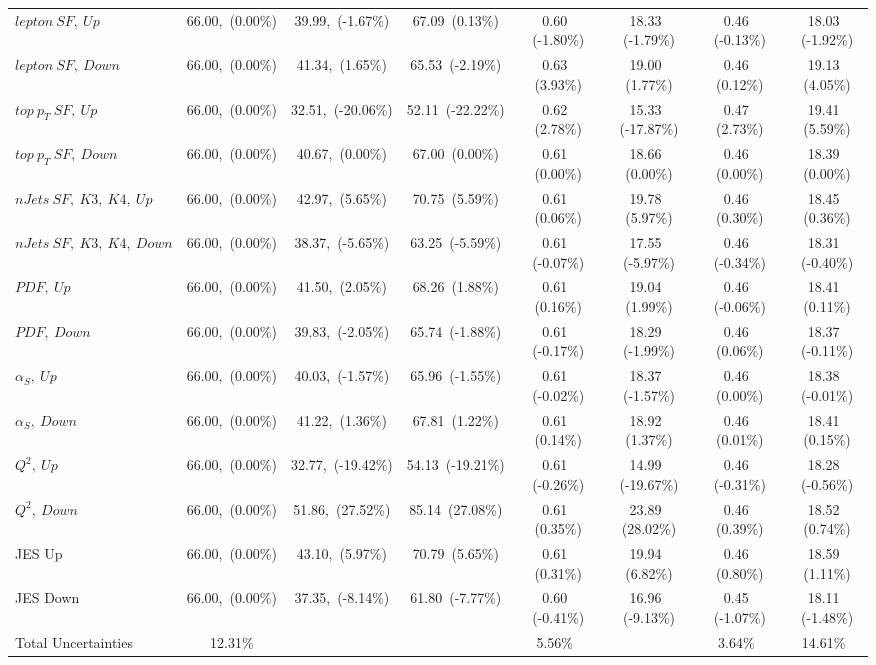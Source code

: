 \begin{table}
\begin{center}
{\begin{tabular}{|l|c|c|c|c|c|c|c|}
$lepton~SF,~Up$ & 66.00,~(0.00\%) & 39.99,~(-1.67\%) & 67.09~(0.13\%) & 0.60 ~(-1.80\%) & 18.33 ~(-1.79\%) & 0.46 ~(-0.13\%) & 18.03 ~(-1.92\%) \\  
$lepton~SF,~Down$ & 66.00,~(0.00\%) & 41.34,~(1.65\%) & 65.53~(-2.19\%) & 0.63 ~(3.93\%) & 19.00 ~(1.77\%) & 0.46 ~(0.12\%) & 19.13 ~(4.05\%) \\ \hline 
$top~p_{T}~SF,~Up$ & 66.00,~(0.00\%) & 32.51,~(-20.06\%) & 52.11~(-22.22\%) & 0.62 ~(2.78\%) & 15.33 ~(-17.87\%) & 0.47 ~(2.73\%) & 19.41 ~(5.59\%) \\  
$top~p_{T}~SF,~Down$ & 66.00,~(0.00\%) & 40.67,~(0.00\%) & 67.00~(0.00\%) & 0.61 ~(0.00\%) & 18.66 ~(0.00\%) & 0.46 ~(0.00\%) & 18.39 ~(0.00\%) \\ \hline 
$nJets~SF,~K3,~K4,~Up$ & 66.00,~(0.00\%) & 42.97,~(5.65\%) & 70.75~(5.59\%) & 0.61 ~(0.06\%) & 19.78 ~(5.97\%) & 0.46 ~(0.30\%) & 18.45 ~(0.36\%) \\  
$nJets~SF,~K3,~K4,~Down$ & 66.00,~(0.00\%) & 38.37,~(-5.65\%) & 63.25~(-5.59\%) & 0.61 ~(-0.07\%) & 17.55 ~(-5.97\%) & 0.46 ~(-0.34\%) & 18.31 ~(-0.40\%) \\ \hline 
$PDF,~Up$ & 66.00,~(0.00\%) & 41.50,~(2.05\%) & 68.26~(1.88\%) & 0.61 ~(0.16\%) & 19.04 ~(1.99\%) & 0.46 ~(-0.06\%) & 18.41 ~(0.11\%) \\  
$PDF,~Down$ & 66.00,~(0.00\%) & 39.83,~(-2.05\%) & 65.74~(-1.88\%) & 0.61 ~(-0.17\%) & 18.29 ~(-1.99\%) & 0.46 ~(0.06\%) & 18.37 ~(-0.11\%) \\ \hline 
$\alpha_{S},~Up$ & 66.00,~(0.00\%) & 40.03,~(-1.57\%) & 65.96~(-1.55\%) & 0.61 ~(-0.02\%) & 18.37 ~(-1.57\%) & 0.46 ~(0.00\%) & 18.38 ~(-0.01\%) \\  
$\alpha_{S},~Down$ & 66.00,~(0.00\%) & 41.22,~(1.36\%) & 67.81~(1.22\%) & 0.61 ~(0.14\%) & 18.92 ~(1.37\%) & 0.46 ~(0.01\%) & 18.41 ~(0.15\%) \\ \hline 
$Q^{2},~Up$ & 66.00,~(0.00\%) & 32.77,~(-19.42\%) & 54.13~(-19.21\%) & 0.61 ~(-0.26\%) & 14.99 ~(-19.67\%) & 0.46 ~(-0.31\%) & 18.28 ~(-0.56\%) \\  
$Q^{2},~Down$ & 66.00,~(0.00\%) & 51.86,~(27.52\%) & 85.14~(27.08\%) & 0.61 ~(0.35\%) & 23.89 ~(28.02\%) & 0.46 ~(0.39\%) & 18.52 ~(0.74\%) \\ \hline 
JES Up & 66.00,~(0.00\%) & 43.10,~(5.97\%) & 70.79~(5.65\%) & 0.61 ~(0.31\%) & 19.94 ~(6.82\%) & 0.46 ~(0.80\%) & 18.59 ~(1.11\%) \\  
JES Down & 66.00,~(0.00\%) & 37.35,~(-8.14\%) & 61.80~(-7.77\%) & 0.60 ~(-0.41\%) & 16.96 ~(-9.13\%) & 0.45 ~(-1.07\%) & 18.11 ~(-1.48\%) \\ \hline \hline 
Total Uncertainties & 12.31\% & & & 5.56\% & & 3.64\% & 14.61\% \\ \hline 
\end{tabular} 
}
\end{center}
\end{table}


